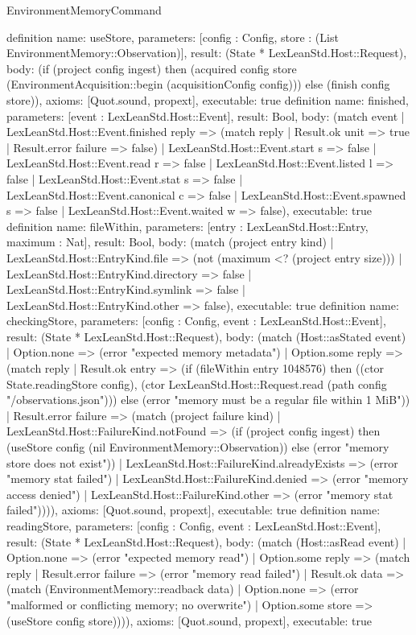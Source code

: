 \begin{lexlean}{EnvironmentMemoryCommand}
\begin{semanticmodule}
{}
definition{
 name: useStore, parameters: [config : Config, store : (List EnvironmentMemory::Observation)], result: (State * LexLeanStd.Host::Request),
 body: (if (project config ingest) then (acquired config store (EnvironmentAcquisition::begin (acquisitionConfig config))) else (finish config store)), axioms: [Quot.sound, propext], executable: true
}
definition{
 name: finished, parameters: [event : LexLeanStd.Host::Event], result: Bool,
 body: (match event | LexLeanStd.Host::Event.finished reply => (match reply | Result.ok unit => true | Result.error failure => false) | LexLeanStd.Host::Event.start s => false | LexLeanStd.Host::Event.read r => false | LexLeanStd.Host::Event.listed l => false | LexLeanStd.Host::Event.stat s => false | LexLeanStd.Host::Event.canonical c => false | LexLeanStd.Host::Event.spawned s => false | LexLeanStd.Host::Event.waited w => false), executable: true
}
definition{
 name: fileWithin, parameters: [entry : LexLeanStd.Host::Entry, maximum : Nat], result: Bool,
 body: (match (project entry kind) | LexLeanStd.Host::EntryKind.file => (not (maximum <? (project entry size))) | LexLeanStd.Host::EntryKind.directory => false | LexLeanStd.Host::EntryKind.symlink => false | LexLeanStd.Host::EntryKind.other => false), executable: true
}
definition{
 name: checkingStore, parameters: [config : Config, event : LexLeanStd.Host::Event], result: (State * LexLeanStd.Host::Request),
 body: (match (Host::asStated event) | Option.none => (error "expected memory metadata") | Option.some reply => (match reply | Result.ok entry => (if (fileWithin entry 1048576) then ((ctor State.readingStore config), (ctor LexLeanStd.Host::Request.read (path config "/observations.json"))) else (error "memory must be a regular file within 1 MiB")) | Result.error failure => (match (project failure kind) | LexLeanStd.Host::FailureKind.notFound => (if (project config ingest) then (useStore config (nil EnvironmentMemory::Observation)) else (error "memory store does not exist")) | LexLeanStd.Host::FailureKind.alreadyExists => (error "memory stat failed") | LexLeanStd.Host::FailureKind.denied => (error "memory access denied") | LexLeanStd.Host::FailureKind.other => (error "memory stat failed")))), axioms: [Quot.sound, propext], executable: true
}
definition{
 name: readingStore, parameters: [config : Config, event : LexLeanStd.Host::Event], result: (State * LexLeanStd.Host::Request),
 body: (match (Host::asRead event) | Option.none => (error "expected memory read") | Option.some reply => (match reply | Result.error failure => (error "memory read failed") | Result.ok data => (match (EnvironmentMemory::readback data) | Option.none => (error "malformed or conflicting memory; no overwrite") | Option.some store => (useStore config store)))), axioms: [Quot.sound, propext], executable: true
}
\end{semanticmodule}
\end{lexlean}
